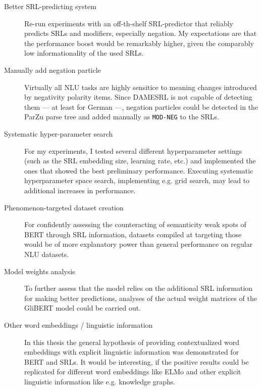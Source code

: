 \begin{description}
  \item[Better SRL-predicting system] Re-run experiments with an off-th-shelf SRL-predictor that reliably
    predicts SRLs and modifiers, especially negation. My expectations are that the performance boost would
    be remarkably higher, given the comparably low informationality of the used SRLs.
  \item[Manually add negation particle] Virtually all NLU tasks are highly sensitice to
    meaning changes introduced by negativity polarity items. Since DAMESRL is not capable
    of detecting them --- at least for German ---, negation particles could be detected in the ParZu parse tree and
    added manually as \texttt{MOD-NEG} to the SRLs.
  \item[Systematic hyper-parameter search] For my experiments, I tested several different hyperparameter
    settings (such as the SRL embedding size, learning rate, etc.) and implemented the ones that
    showed the best preliminary performance. Executing systematic hyperparameter space search, implementing e.g. grid search, may
    lead to additional increases in performance.
  \item[Phenomenon-targeted dataset creation] For confidently assessing the counteracting of semanticity
    weak spots of BERT through SRL information, datasets compiled at targeting those would be of more
    explanatory power than general performance on regular NLU datasets.
  \item[Model weights analysis] To further assess that the model relies on the additional SRL information for
    making better predictions, analyses of the actual weight matrices of the GliBERT model could be carried out.
  \item[Other word embeddings / linguistic information] In this thesis the general hypothesis of providing
    contextualized word embeddings with explicit linguistic information was demonstrated for BERT and SRLs.
    It would be interesting, if the positive results could be replicated for different word embeddings like
    ELMo and other explicit linguistic information like e.g. knowledge graphs.
\end{description}


